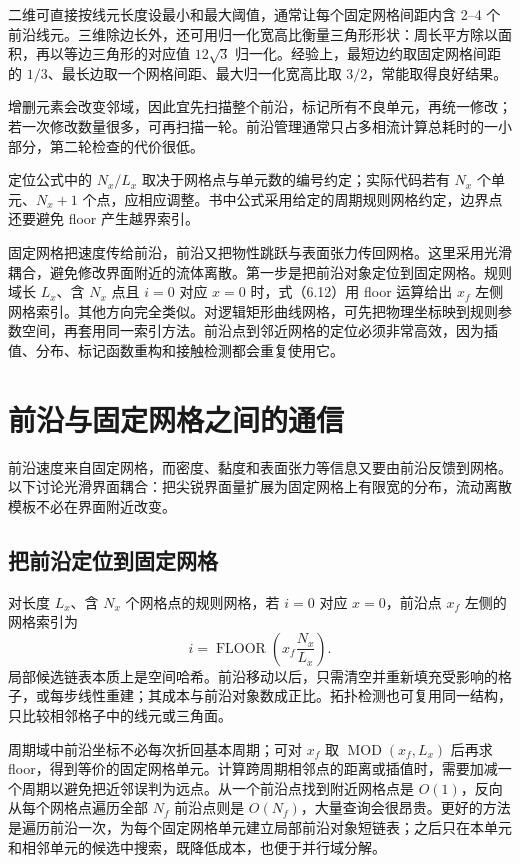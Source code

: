 \documentclass[11pt,a4paper,openany,fontset=none]{ctexbook}
\begin{document}
二维可直接按线元长度设最小和最大阈值，通常让每个固定网格间距内含 2--4 个前沿线元。三维除边长外，还可用归一化宽高比衡量三角形形状：周长平方除以面积，再以等边三角形的对应值 $12\sqrt3$ 归一化。经验上，最短边约取固定网格间距的 $1/3$、最长边取一个网格间距、最大归一化宽高比取 $3/2$，常能取得良好结果。

增删元素会改变邻域，因此宜先扫描整个前沿，标记所有不良单元，再统一修改；若一次修改数量很多，可再扫描一轮。前沿管理通常只占多相流计算总耗时的一小部分，第二轮检查的代价很低。

定位公式中的 $N_x/L_x$ 取决于网格点与单元数的编号约定；实际代码若有 $N_x$ 个单元、$N_x+1$ 个点，应相应调整。书中公式采用给定的周期规则网格约定，边界点还要避免 floor 产生越界索引。

固定网格把速度传给前沿，前沿又把物性跳跃与表面张力传回网格。这里采用光滑耦合，避免修改界面附近的流体离散。第一步是把前沿对象定位到固定网格。规则域长 $L_x$、含 $N_x$ 点且 $i=0$ 对应 $x=0$ 时，式（6.12）用 floor 运算给出 $x_f$ 左侧网格索引。其他方向完全类似。对逻辑矩形曲线网格，可先把物理坐标映到规则参数空间，再套用同一索引方法。前沿点到邻近网格的定位必须非常高效，因为插值、分布、标记函数重构和接触检测都会重复使用它。

\section{前沿与固定网格之间的通信}

前沿速度来自固定网格，而密度、黏度和表面张力等信息又要由前沿反馈到网格。以下讨论光滑界面耦合：把尖锐界面量扩展为固定网格上有限宽的分布，流动离散模板不必在界面附近改变。

\subsection{把前沿定位到固定网格}

对长度 $L_x$、含 $N_x$ 个网格点的规则网格，若 $i=0$ 对应 $x=0$，前沿点 $x_f$ 左侧的网格索引为
\begin{equation}
i=\operatorname{FLOOR}\!\left(x_f\frac{N_x}{L_x}\right).
\tag{6.12}
\end{equation}
局部候选链表本质上是空间哈希。前沿移动以后，只需清空并重新填充受影响的格子，或每步线性重建；其成本与前沿对象数成正比。拓扑检测也可复用同一结构，只比较相邻格子中的线元或三角面。

周期域中前沿坐标不必每次折回基本周期；可对 $x_f$ 取 $\operatorname{MOD}(x_f,L_x)$ 后再求 floor，得到等价的固定网格单元。计算跨周期相邻点的距离或插值时，需要加减一个周期以避免把近邻误判为远点。从一个前沿点找到附近网格点是 $O(1)$，反向从每个网格点遍历全部 $N_f$ 前沿点则是 $O(N_f)$，大量查询会很昂贵。更好的方法是遍历前沿一次，为每个固定网格单元建立局部前沿对象短链表；之后只在本单元和相邻单元的候选中搜索，既降低成本，也便于并行域分解。
\end{document}
